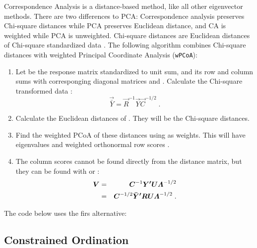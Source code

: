 Correspondence Analysis is a distance-based method, like all other
eigenvector methods. There are two differences to PCA: Correspondence
analysis preserves Chi-square distances while PCA preserves Euclidean
distance, and CA is weighted while PCA is unweighted.  Chi-square
distances are Euclidean distances of Chi-square standardized data
\citep{LegeGall01}. The following algorithm combines Chi-square
distances with weighted Principal Coordinate Analysis
(\texttt{wPCoA}):
\begin{enumerate}
\item Let  be the response matrix standardized to unit sum,
   and  its row and column sums with corresponging
  diagonal matrices  and . Calculate the Chi-square
  transformed data :
  \begin{equation}
    \vec{\bar Y} = \vec{R}^{-1} \vec{Y} \vec{C}^{-1/2} \;.
  \end{equation}
\item Calculate the Euclidean distances of . They will be
  the Chi-square distances.
\item Find the weighted PCoA of these distances using  as
  weights. This will have eigenvalues \vec{\bLambda} and weighted
  orthonormal row scores .
\item The column scores  cannot be found directly from the
  distance matrix, but they can be found with  or :
  \begin{eqnarray}
    \vec{V} &=& \vec{C}^{-1} \vec{Y' U} \bLambda^{-1/2}\\
    &=& \vec{C}^{-1/2} \vec{\bar{Y}' R U} \bLambda^{-1/2}\;.
  \end{eqnarray}
\end{enumerate}
The code below uses the firs alternative:

\begin{Schunk}
\end{Schunk}

\subsection{Constrained Ordination}

